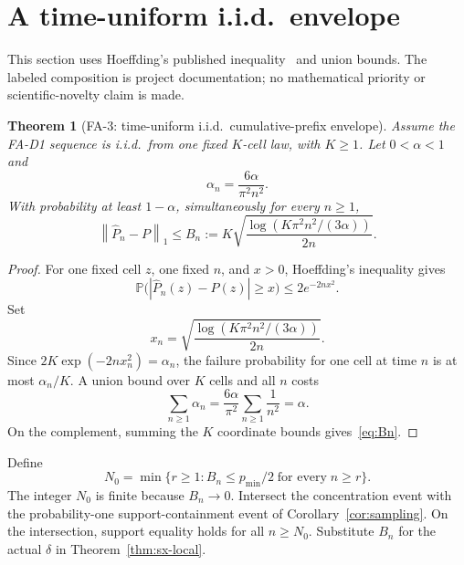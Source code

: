 \documentclass[11pt]{article}
\newtheorem{theorem}{Theorem}[section]
\theoremstyle{definition}
\newcommand{\Phat}{\widehat{P}}
\newcommand{\Prb}{\mathbb{P}}
\newcommand{\normone}[1]{\left\lVert #1\right\rVert_1}
\begin{document}
\section{A time-uniform i.i.d.\ envelope}

This section uses Hoeffding's published inequality~\cite{hoeffding1963} and union bounds.  The
labeled composition is project documentation; no mathematical priority or scientific-novelty
claim is made.

\begin{theorem}[FA-3: time-uniform i.i.d.\ cumulative-prefix envelope]\label{thm:anytime}
Assume the FA-D1 sequence is i.i.d.\ from one fixed $K$-cell law, with $K\ge1$.  Let
$0<\alpha<1$ and
\begin{equation}
  \alpha_n=\frac{6\alpha}{\pi^2n^2}.
\end{equation}
With probability at least $1-\alpha$, simultaneously for every $n\ge1$,
\begin{equation}\label{eq:Bn}
  \normone{\Phat_n-P}
  \le B_n
  :=K\sqrt{\frac{\log(K\pi^2n^2/(3\alpha))}{2n}}.
\end{equation}
\end{theorem}

\begin{proof}
For one fixed cell $z$, one fixed $n$, and $x>0$, Hoeffding's inequality gives
\begin{equation}
  \Prb\bigl(|\Phat_n(z)-P(z)|\ge x\bigr)\le2e^{-2nx^2}.
\end{equation}
Set
\begin{equation}
  x_n=\sqrt{\frac{\log(K\pi^2n^2/(3\alpha))}{2n}}.
\end{equation}
Since $2K\exp(-2nx_n^2)=\alpha_n$, the failure probability for one cell at time $n$ is at most
$\alpha_n/K$.  A union bound over $K$
cells and all $n$ costs
\begin{equation}
  \sum_{n\ge1}\alpha_n
  =\frac{6\alpha}{\pi^2}\sum_{n\ge1}\frac1{n^2}
  =\alpha.
\end{equation}
On the complement, summing the $K$ coordinate bounds gives~\eqref{eq:Bn}.
\end{proof}

Define
\begin{equation}
  N_0=\min\!\bigl\lbrace r\ge1:B_n\le p_{\min}/2\;\text{for every}\;n\ge r\bigr\rbrace.
\end{equation}
The integer $N_0$ is finite because $B_n\to0$.  Intersect the concentration event with the
probability-one support-containment event of Corollary~\ref{cor:sampling}.  On the intersection,
support equality holds for all $n\ge N_0$.  Substitute $B_n$ for the actual $\delta$ in
Theorem~\ref{thm:sx-local}.
\end{document}
